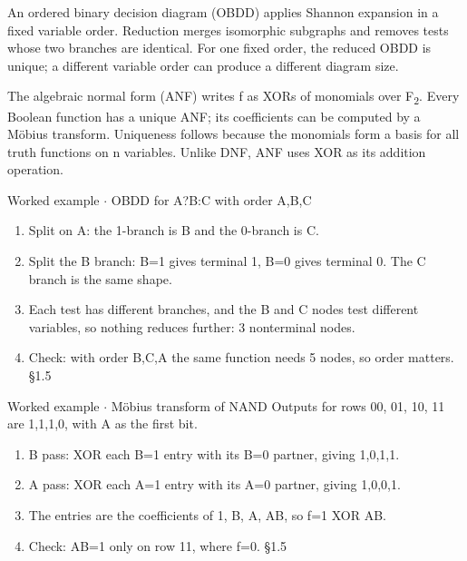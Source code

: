 \documentclass[11pt]{article}
\begin{document}
\begin{keepsection}
An ordered binary decision diagram (OBDD) applies Shannon expansion in a fixed variable order. Reduction merges isomorphic subgraphs and removes tests whose two branches are identical. For one fixed order, the reduced OBDD is unique; a different variable order can produce a different diagram size.

The algebraic normal form (ANF) writes f as XORs of monomials over F\textsubscript{2}. Every Boolean function has a unique ANF; its coefficients can be computed by a Möbius transform. Uniqueness follows because the monomials form a basis for all truth functions on n variables. Unlike DNF, ANF uses XOR as its addition operation.

\begin{workedbox}{Worked example \ensuremath{\cdot} OBDD for A?B:C with order A,B,C}
\begin{enumerate}
\item Split on A: the 1-branch is B and the 0-branch is C.
\item Split the B branch: B=1 gives terminal 1, B=0 gives terminal 0. The C branch is the same shape.
\item Each test has different branches, and the B and C nodes test different variables, so nothing reduces further: 3 nonterminal nodes.
\item Check: with order B,C,A the same function needs 5 nodes, so order matters. \hfill{\small\color{FAUblue}§1.5}
\end{enumerate}
\end{workedbox}

\begin{workedbox}{Worked example \ensuremath{\cdot} Möbius transform of NAND}
Outputs for rows 00, 01, 10, 11 are 1,1,1,0, with A as the first bit.

\begin{enumerate}
\item B pass: XOR each B=1 entry with its B=0 partner, giving 1,0,1,1.
\item A pass: XOR each A=1 entry with its A=0 partner, giving 1,0,0,1.
\item The entries are the coefficients of 1, B, A, AB, so f=1 XOR AB.
\item Check: AB=1 only on row 11, where f=0. \hfill{\small\color{FAUblue}§1.5}
\end{enumerate}
\end{workedbox}


\end{keepsection}
\end{document}
